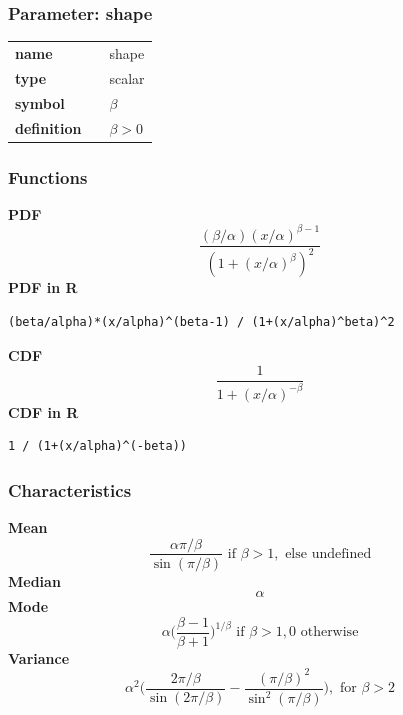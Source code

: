 \subsubsection*{Parameter: shape}

\noindent\begin{tabular}{p{2cm}cl}
\textbf{name} & & shape \\
\textbf{type} & & scalar \\
\textbf{symbol} & & $\beta$  \\
\textbf{definition} & & $\beta > 0$
\end{tabular}
\subsubsection*{Functions}

\smallskip \noindent \hspace{.2cm} \textbf{PDF} 
\begin{equation*}\frac{(\beta/\alpha)(x/\alpha)^{\beta-1}}{(1+(x/\alpha)^\beta)^2}\end{equation*}
\smallskip \noindent \hspace{.2cm} \textbf{PDF in R}  
\begin{verbatim}(beta/alpha)*(x/alpha)^(beta-1) / (1+(x/alpha)^beta)^2\end{verbatim}
\smallskip \noindent \hspace{.2cm} \textbf{CDF} 
\begin{equation*}\frac{1}{1+(x/\alpha)^{-\beta}}\end{equation*}
\smallskip \noindent \hspace{.2cm} \textbf{CDF in R} 
\begin{verbatim}1 / (1+(x/alpha)^(-beta))\end{verbatim}
\smallskip
\subsubsection*{Characteristics}
\smallskip \noindent \hspace{.2cm} \textbf{Mean} 
\begin{equation*}\frac{\alpha \pi/\beta}{\sin(\pi/\beta)} \text{ if } \beta>1, \text{ else undefined}\end{equation*}
\smallskip \noindent \hspace{.2cm} \textbf{Median} 
\begin{equation*}\alpha\end{equation*}
\smallskip \noindent \hspace{.2cm} \textbf{Mode} 
\begin{equation*}\alpha \Big(\frac{\beta-1}{\beta+1}\Big)^{1/\beta} \text{ if } \beta>1, 0 \text{ otherwise}\end{equation*}
\smallskip \noindent \hspace{.2cm} \textbf{Variance} 
\begin{equation*}\alpha^2 \Big(\frac{2\pi/\beta}{\sin(2\pi/\beta)} - \frac{(\pi/\beta)^2}{\sin^2(\pi/\beta)} \Big), \text{ for } \beta>2\end{equation*}
\smallskip
